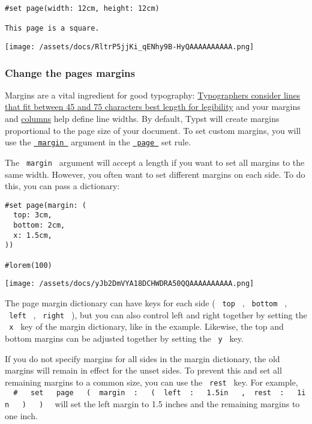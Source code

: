 \begin{verbatim}
#set page(width: 12cm, height: 12cm)

This page is a square.
\end{verbatim}

\texttt{[image: /assets/docs/RltrP5jjKi\_qENhy9B-HyQAAAAAAAAAA.png]}

\subsubsection{Change the page\textquotesingle s
margins}\label{change-margins}

Margins are a vital ingredient for good typography:
\href{http://webtypography.net/2.1.2}{Typographers consider lines that
fit between 45 and 75 characters best length for legibility} and your
margins and \hyperref[columns]{columns} help define line widths. By
default, Typst will create margins proportional to the page size of your
document. To set custom margins, you will use the
\href{/docs/reference/layout/page/\#parameters-margin}{\texttt{\ margin\ }}
argument in the \href{/docs/reference/layout/page/}{\texttt{\ page\ }}
set rule.

The \texttt{\ margin\ } argument will accept a length if you want to set
all margins to the same width. However, you often want to set different
margins on each side. To do this, you can pass a dictionary:

\begin{verbatim}
#set page(margin: (
  top: 3cm,
  bottom: 2cm,
  x: 1.5cm,
))

#lorem(100)
\end{verbatim}

\texttt{[image: /assets/docs/yJb2DmVYA18DCHWDRA50QQAAAAAAAAAA.png]}

The page margin dictionary can have keys for each side (
\texttt{\ top\ } , \texttt{\ bottom\ } , \texttt{\ left\ } ,
\texttt{\ right\ } ), but you can also control left and right together
by setting the \texttt{\ x\ } key of the margin dictionary, like in the
example. Likewise, the top and bottom margins can be adjusted together
by setting the \texttt{\ y\ } key.

If you do not specify margins for all sides in the margin dictionary,
the old margins will remain in effect for the unset sides. To prevent
this and set all remaining margins to a common size, you can use the
\texttt{\ rest\ } key. For example,
\texttt{\ }{\texttt{\ \#\ }}\texttt{\ }{\texttt{\ set\ }}\texttt{\ }{\texttt{\ page\ }}\texttt{\ }{\texttt{\ (\ }}\texttt{\ margin\ }{\texttt{\ :\ }}\texttt{\ }{\texttt{\ (\ }}\texttt{\ left\ }{\texttt{\ :\ }}\texttt{\ }{\texttt{\ 1.5in\ }}\texttt{\ }{\texttt{\ ,\ }}\texttt{\ rest\ }{\texttt{\ :\ }}\texttt{\ }{\texttt{\ 1in\ }}\texttt{\ }{\texttt{\ )\ }}\texttt{\ }{\texttt{\ )\ }}\texttt{\ }
will set the left margin to 1.5 inches and the remaining margins to one
inch.

